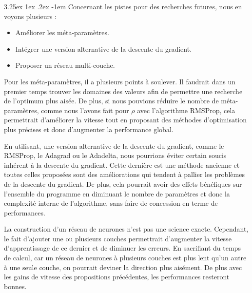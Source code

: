 \documentclass[a4paper, 11pt]{article}
\makeatletter
\renewcommand\paragraph{\@startsection{paragraph}{5}{\z@}%
  {3.25ex \@plus1ex \@minus.2ex}%
  {-1em}%
  {\normalfont\normalsize\bfseries}}
\makeatother
\begin{document}
\paragraph{}
Concernant les pistes pour des recherches futures, nous en voyons plusieurs :
\begin{itemize}
 \item Améliorer les méta-paramètres.
 \item Intégrer une version alternative de la descente du gradient.
 \item Proposer un réseau multi-couche.
\end{itemize}

Pour les méta-paramètres, il a plusieurs points à soulever. Il faudrait dans un premier temps trouver les domaines des valeurs afin de permettre
une recherche de l'optimum plus aisée. De plus, si nous pouvions réduire le nombre de méta-paramètres, comme nous l'avons fait pour $\rho$ avec l'algorithme
RMSProp, cela permettrait d'améliorer la vitesse tout en proposant des méthodes d'optimisation plus précises et donc d'augmenter la performance global.

En utilisant, une version alternative de la descente du gradient, comme le RMSProp, le Adagrad ou le Adadelta, nous pourrions éviter certain soucis
inhérent à la descente du gradient. Cette dernière est une méthode ancienne et toutes celles proposées sont des améliorations qui tendent à pallier les
problèmes de la descente du gradient. De plus, cela pourrait avoir des effets bénéfiques sur l'ensemble du programme en diminuant le nombre de paramètres
et donc la complexité interne de l'algorithme, sans faire de concession en terme de performances.

La construction d'un réseau de neurones n'est pas une science exacte. Cependant, le fait d'ajouter une ou plusieurs couches permettrait d'augmenter la 
vitesse d'apprentissage de ce dernier et de diminuer les erreurs. En sacrifiant du temps de calcul, car un réseau de neurones à plusieurs couches est plus
lent qu'un autre à une seule couche, on pourrait deviner la direction plus aisément. De plus avec les gains de vitesse des propositions précédentes, les
performances resteront bonnes.

\newpage

\nocite{*}

\end{document}

